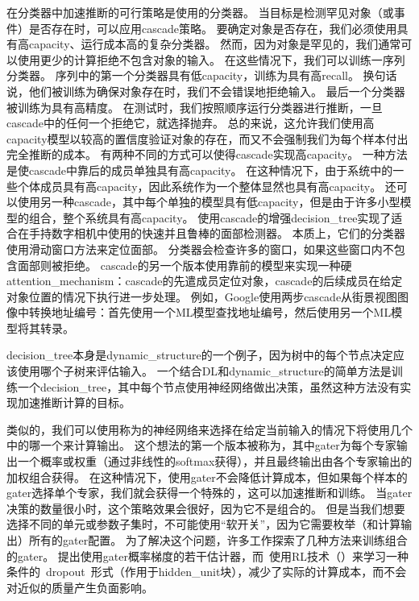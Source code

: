 在分类器中加速推断的可行策略是使用的分类器。
当目标是检测罕见对象（或事件）是否存在时，可以应用\gls{cascade}策略。
要确定对象是否存在，我们必须使用具有高\gls{capacity}、运行成本高的复杂分类器。 
然而，因为对象是罕见的，我们通常可以使用更少的计算拒绝不包含对象的输入。
在这些情况下，我们可以训练一序列分类器。
序列中的第一个分类器具有低\gls{capacity}，训练为具有高\gls{recall}。
换句话说，他们被训练为确保对象存在时，我们不会错误地拒绝输入。
最后一个分类器被训练为具有高精度。
在测试时，我们按照顺序运行分类器进行推断，一旦\gls{cascade}中的任何一个拒绝它，就选择抛弃。
总的来说，这允许我们使用高\gls{capacity}模型以较高的置信度验证对象的存在，而又不会强制我们为每个样本付出完全推断的成本。
有两种不同的方式可以使得\gls{cascade}实现高\gls{capacity}。
一种方法是使\gls{cascade}中靠后的成员单独具有高\gls{capacity}。
在这种情况下，由于系统中的一些个体成员具有高\gls{capacity}，因此系统作为一个整体显然也具有高\gls{capacity}。
还可以使用另一种\gls{cascade}，其中每个单独的模型具有低\gls{capacity}，但是由于许多小型模型的组合，整个系统具有高\gls{capacity}。
\citet{Viola01}使用\gls{cascade}的增强\gls{decision_tree}实现了适合在手持数字相机中使用的快速并且鲁棒的面部检测器。
本质上，它们的分类器使用滑动窗口方法来定位面部。
分类器会检查许多的窗口，如果这些窗口内不包含面部则被拒绝。
\gls{cascade}的另一个版本使用靠前的模型来实现一种硬\gls{attention_mechanism}：\gls{cascade}的先遣成员定位对象，\gls{cascade}的后续成员在给定对象位置的情况下执行进一步处理。
例如，Google使用两步\gls{cascade}从街景视图图像中转换地址编号：首先使用一个\gls{ML}模型查找地址编号，然后使用另一个\gls{ML}模型将其转录\citep{Goodfellow+et+al-ICLR2014a}。

\gls{decision_tree}本身是\gls{dynamic_structure}的一个例子，因为树中的每个节点决定应该使用哪个子树来评估输入。
一个结合\gls{DL}和\gls{dynamic_structure}的简单方法是训练一个\gls{decision_tree}，其中每个节点使用神经网络做出决策\citep{guo1992classification}，虽然这种方法没有实现加速推断计算的目标。



类似的，我们可以使用称为的神经网络来选择在给定当前输入的情况下将使用几个中的哪一个来计算输出。
这个想法的第一个版本被称为\citep{Nowlan90,Jacobs-nc91}，其中\gls{gater}为每个专家输出一个概率或权重（通过非线性的\gls{softmax}获得），并且最终输出由各个专家输出的加权组合获得。
在这种情况下，使用\gls{gater}不会降低计算成本，但如果每个样本的\gls{gater}选择单个专家，我们就会获得一个特殊的\,\citep{collobert:2001:rr01-12,collobert:2002}，这可以加速推断和训练。
当\gls{gater}决策的数量很小时，这个策略效果会很好，因为它不是组合的。
但是当我们想要选择不同的单元或参数子集时，不可能使用``软开关''，因为它需要枚举（和计算输出）所有的\gls{gater}配置。
为了解决这个问题，许多工作探索了几种方法来训练组合的\gls{gater}。
\citet{bengio2013estimating}提出使用\gls{gater}概率梯度的若干估计器，而~\citet{Bacon-et-al-RLDM2015,BengioE-et-al-arXiv2015}使用\gls{RL}技术（）来学习一种条件的~\gls{dropout}~形式（作用于\gls{hidden_unit}块），减少了实际的计算成本，而不会对近似的质量产生负面影响。


